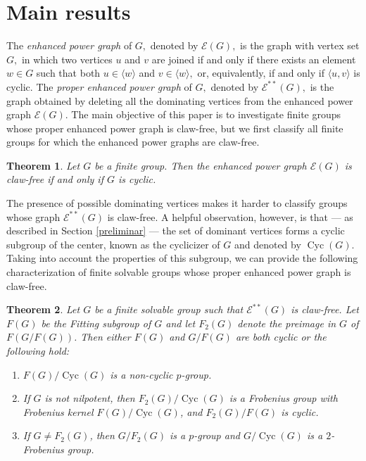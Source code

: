 \documentclass[preprint,11pt]{elsarticle}
\newcommand{\cyc}{\operatorname{Cyc}}
\newtheorem{theorem}{\bf Theorem}[section]
\begin{document}
\section{Main results}
\label{sec:main_results}
The \emph{enhanced power graph} of $G,$
denoted by $\mathcal{E}(G),$ is the graph with vertex set $G,$ in which two vertices $u$ and $v$ are joined if and only
if there exists an element $w \in G$ such that both $u \in \langle w \rangle $ and $v \in  \langle w \rangle,$ or, equivalently, if and only if $\langle u, v\rangle$ is cyclic.
The \emph{proper enhanced power graph} of $G,$ denoted by $\mathcal{E}^{**}(G),$ is the graph obtained by deleting all the dominating vertices from the enhanced power graph $\mathcal{E}(G).$     
The main objective of this paper is to investigate finite groups whose proper enhanced power graph is claw-free, but we first classify all finite groups for which the enhanced power graphs are claw-free. 
\begin{theorem}\label{Thm:enh-claw-free-imply-uniuq-subgroup}
Let \(G\) be a finite group. Then the enhanced power graph \(\mathcal{E}(G)\) is claw-free if and only if $G$ is cyclic.
\end{theorem}


The presence of possible dominating vertices makes it harder to classify groups whose graph $\mathcal{E}^{**}(G)$ is claw-free. A helpful observation, however, is that — as described in Section \ref{preliminar} — the set of dominant vertices forms a cyclic subgroup of the center, known as the cyclicizer of $G$ and denoted by $\cyc(G)$. Taking into account the properties of this subgroup, we can provide the following characterization of finite solvable groups whose proper enhanced power graph is claw-free.


\begin{theorem}\label{solvable}
	Let $G$ be a finite solvable group such that $\mathcal{E}^{**}(G)$ 
	is claw-free. Let $F(G)$ be the Fitting subgroup of $G$ and 
let $F_2(G)$ denote the preimage 
	in $G$ of $F(G/F(G))$.
	Then either $F(G)$ and $G/F(G)$ are both cyclic or the  following hold:
	\begin{enumerate}
		\item $F(G)/\cyc(G)$ is a non-cyclic $p$-group.
		\item If $G$ is not nilpotent, then $F_2(G)/\cyc(G)$ is a Frobenius group with 
		Frobenius kernel $F(G)/\cyc(G)$, and $F_2(G)/F(G)$ is cyclic.
		\item If $G \neq F_2(G)$, then $G/F_2(G)$ is a $p$-group and 
		$G/\cyc(G)$ is a $2$-Frobenius group.
	\end{enumerate}
\end{theorem}
\end{document}
